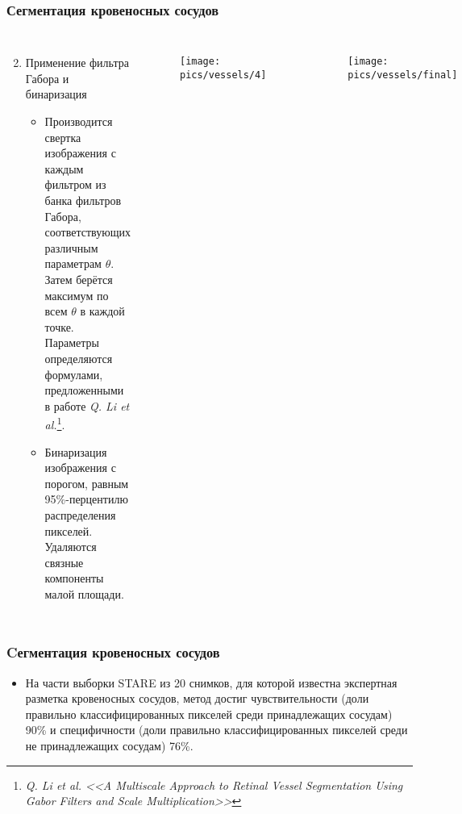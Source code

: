 \documentclass{beamer}
\let\oldfootnote\footnote
\renewcommand\footnote[1][]{\oldfootnote[frame,#1]}
\begin{document}
\begin{frame}
	\frametitle{Сегментация кровеносных сосудов}
	
	\begin{columns}[c]
		\begin{enumerate}
			\setcounter{enumi}{1}
			\item Применение фильтра Габора и бинаризация
			\begin{itemize}
				\item Производится свертка изображения с каждым фильтром из банка фильтров Габора, соответствующих различным параметрам $\theta$. Затем берётся максимум по всем $\theta$ в каждой точке. Параметры определяются формулами, предложенными в работе \textit{Q. Li et al.}\footnote{\scriptsize \textit{Q. Li et al. <<A Multiscale Approach to Retinal Vessel Segmentation Using Gabor Filters and Scale Multiplication>>}}.
				\item Бинаризация изображения с порогом, равным 95\%-перцентилю распределения пикселей. Удаляются связные компоненты малой площади.
			\end{itemize}
		\end{enumerate}
		
		\begin{figure}
		\texttt{[image: pics/vessels/4]}
		\label{fig:4}
		\vspace*{-1.5cm}
		\end{figure}
		\begin{figure}
		\texttt{[image: pics/vessels/final]}
		\label{fig:final}
		\end{figure}
		
	\end{columns}
\end{frame}

\begin{frame}
	\frametitle{Cегментация кровеносных сосудов}
	
	\begin{itemize}
		\item На части выборки STARE из 20 снимков, для которой известна экспертная разметка кровеносных сосудов, метод достиг чувствительности (доли правильно классифицированных пикселей среди
		принадлежащих сосудам) 90\% и специфичности (доли правильно классифицированных пикселей среди не принадлежащих сосудам) 76\%.
	\end{itemize}
\end{frame}
\end{document}

